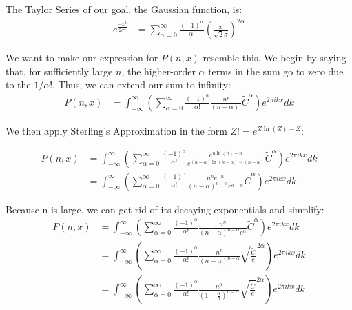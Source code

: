 \documentclass[10pt]{article} %
\begin{document}
The Taylor Series of our goal, the Gaussian function, is:\\

\begin{align*}
  e^{\frac{-x^2}{2\sigma^2}} &= \sum_{\alpha=0}^\infty \frac{(-1)^\alpha}{\alpha!}\left(\frac{x}{\sqrt{2}\sigma}\right)^{2\alpha}
\end{align*}

We want to make our expression for $P(n,x)$ resemble this. We begin by saying that, for sufficiently large $n$, the higher-order
$\alpha$ terms in the sum go to zero due to the $1/\alpha!$. Thus, we can extend our sum to infinity:\\

\begin{align}
  P(n,x) &= \int_{-\infty}^{\infty}\left(\sum_{\alpha=0}^\infty \frac{(-1)^\alpha}{\alpha!}\frac{n!}{(n-\alpha)!} \widetilde{C}^\alpha\right)e^{2\pi ikx}dk
\end{align}

We then apply Sterling's Approximation in the form $Z! = e^{Z\ln(Z)-Z}$:

\begin{align}
  P(n,x) &= \int_{-\infty}^{\infty}\left(\sum_{\alpha=0}^\infty \frac{(-1)^\alpha}{\alpha!}\frac{e^{n\ln(n)-n}}{e^{(n-\alpha)\ln(n-\alpha)-(n-\alpha)}} \widetilde{C}^\alpha\right)e^{2\pi ikx}dk\\
  &= \int_{-\infty}^{\infty}\left(\sum_{\alpha=0}^\infty \frac{(-1)^\alpha}{\alpha!}\frac{n^ne^{-n}}{(n-\alpha)^{n-\alpha}e^{\alpha-n}} \widetilde{C}^\alpha\right)e^{2\pi ikx}dk
\end{align}

Because n is large, we can get rid of its decaying exponentials and simplify:\\

\begin{align}
  P(n,x) &= \int_{-\infty}^{\infty}\left(\sum_{\alpha=0}^\infty \frac{(-1)^\alpha}{\alpha!}\frac{n^n}{(n-\alpha)^{n-\alpha}e^{\alpha}} \widetilde{C}^\alpha\right)e^{2\pi ikx}dk\\
  &= \int_{-\infty}^{\infty}\left(\sum_{\alpha=0}^\infty \frac{(-1)^\alpha}{\alpha!}\frac{n^n}{(n-\alpha)^{n-\alpha}} \sqrt{\frac{\widetilde{C}}{e}}^{2\alpha}\right)e^{2\pi ikx}dk\\
  &= \int_{-\infty}^{\infty}\left(\sum_{\alpha=0}^\infty \frac{(-1)^\alpha}{\alpha!}\frac{n^\alpha}{(1-\frac{\alpha}{n})^{n-\alpha}} \sqrt{\frac{\widetilde{C}}{e}}^{2\alpha}\right)e^{2\pi ikx}dk
\end{align}
\end{document}

